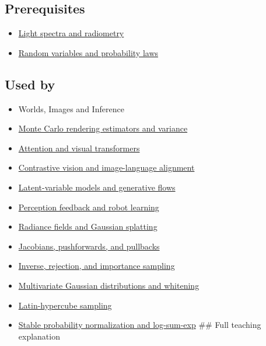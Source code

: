 \subsection{Prerequisites}\label{appendix-4815cd87ab8b-prerequisites}

\begin{itemize}
\tightlist
\item
  \hyperref[appendix-215c2570199b]{Light spectra and radiometry}
\item
  \hyperref[appendix-4d0203f7944f]{Random variables and probability laws}
\end{itemize}

\subsection{Used by}\label{appendix-4815cd87ab8b-used-by}

\begin{itemize}
\item
  {Worlds, Images and Inference}
\item
  \hyperref[appendix-031e02bf28af]{Monte Carlo rendering estimators and variance}
\item
  \hyperref[appendix-a9d5dfdd164a]{Attention and visual transformers}
\item
  \hyperref[appendix-772f1fd96148]{Contrastive vision and image-language alignment}
\item
  \hyperref[appendix-2c568f05ee34]{Latent-variable models and generative flows}
\item
  \hyperref[appendix-b0c42da325f1]{Perception feedback and robot learning}
\item
  \hyperref[appendix-c5b332e400e7]{Radiance fields and Gaussian splatting}
\item
  \hyperref[appendix-d8a7ddb675eb]{Jacobians, pushforwards, and pullbacks}
\item
  \hyperref[appendix-8d863ed954d0]{Inverse, rejection, and importance sampling}
\item
  \hyperref[appendix-12bbe185dbe5]{Multivariate Gaussian distributions and whitening}
\item
  \hyperref[appendix-1c5e85693a06]{Latin-hypercube sampling}
\item
  \hyperref[appendix-d580b422240f]{Stable probability normalization and log-sum-exp} \#\# Full teaching explanation
\end{itemize}


